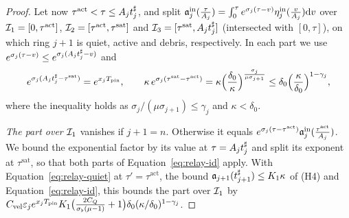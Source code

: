 \begin{proof}
Let now $\tau^{\mathrm{act}}<\tau\le A_jt^\sharp_j$, and split
$\mathfrak{a}^{\mathrm{in}}_j(\frac{\tau}{A_j})=\int_0^\tau e^{\sigma_j(\tau-v)}\eta^{\mathrm{in}}_j(\frac{v}{A_j})\dd v$ over
$\mathcal{I}_1=[0,\tau^{\mathrm{act}}]$, $\mathcal{I}_2=[\tau^{\mathrm{act}},\tau^{\mathrm{sat}}]$ and
$\mathcal{I}_3=[\tau^{\mathrm{sat}},A_jt^\sharp_j]$ (intersected with $[0,\tau]$), on which ring
$j+1$ is quiet, active and debris, respectively. In each part we use
$e^{\sigma_j(\tau-v)}\le e^{\sigma_j(A_jt^\sharp_j-v)}$ and
\begin{equation}
\label{eq:relay-id}
e^{\sigma_j(A_jt^\sharp_j-\tau^{\mathrm{sat}})}=e^{x_jT_{\mathrm{pin}}},\qquad
\kappa\,e^{\sigma_j(\tau^{\mathrm{sat}}-\tau^{\mathrm{act}})}=\kappa\Big(\frac{\delta_0}\kappa\Big)^{\frac{\sigma_j}{\mu\sigma_{j+1}}}\le\delta_0\Big(\frac\kappa{\delta_0}\Big)^{1-\gamma_j},
\end{equation}
where the inequality holds as $\sigma_j/(\mu\sigma_{j+1})\le\gamma_j$ and $\kappa<\delta_0$.

\emph{The part over $\mathcal{I}_1$} vanishes if $j+1=n$. Otherwise it equals
$e^{\sigma_j(\tau-\tau^{\mathrm{act}})}\mathfrak{a}^{\mathrm{in}}_j(\frac{\tau^{\mathrm{act}}}{A_j})$. We
bound the exponential factor by its value at $\tau=A_jt^\sharp_j$ and split its exponent
at $\tau^{\mathrm{sat}}$, so that both parts of Equation~\eqref{eq:relay-id} apply. With
Equation~\eqref{eq:relay-quiet} at $\tau'=\tau^{\mathrm{act}}$, the bound
$\mathfrak{a}_{j+1}(t^\sharp_{j+1})\le K_1\kappa$ of (H4) and
Equation~\eqref{eq:relay-id}, this bounds the part over $\mathcal{I}_1$ by
$C_{\mathrm{vel}} \varepsilon_je^{x_jT_{\mathrm{pin}}}K_1\big(\frac{2C_Q}{\sigma_\flat(\mu-1)}+1\big)\delta_0(\kappa/\delta_0)^{1-\gamma_j}$.


\end{proof}
